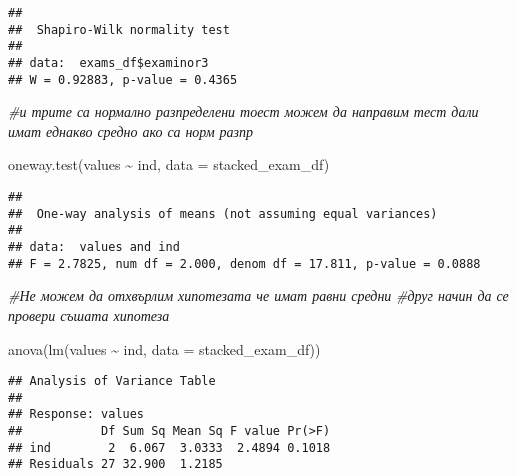 \documentclass[
]{article}
\newenvironment{Shaded}{\begin{snugshade}}{\end{snugshade}}
\newcommand{\AttributeTok}[1]{\textcolor[rgb]{0.77,0.63,0.00}{#1}}
\newcommand{\CommentTok}[1]{\textcolor[rgb]{0.56,0.35,0.01}{\textit{#1}}}
\newcommand{\FunctionTok}[1]{\textcolor[rgb]{0.00,0.00,0.00}{#1}}
\newcommand{\NormalTok}[1]{#1}
\newcommand{\OtherTok}[1]{\textcolor[rgb]{0.56,0.35,0.01}{#1}}
\newcommand{\SpecialCharTok}[1]{\textcolor[rgb]{0.00,0.00,0.00}{#1}}
\newcommand{\StringTok}[1]{\textcolor[rgb]{0.31,0.60,0.02}{#1}}
\begin{document}
\begin{verbatim}
## 
##  Shapiro-Wilk normality test
## 
## data:  exams_df$examinor3
## W = 0.92883, p-value = 0.4365
\end{verbatim}

\begin{Shaded}
\begin{Highlighting}[]
\CommentTok{\#и трите са нормално  разпределени тоест можем да направим тест дали имат еднакво средно ако са норм разпр}

\FunctionTok{oneway.test}\NormalTok{(values }\SpecialCharTok{\textasciitilde{}}\NormalTok{ ind, }\AttributeTok{data =}\NormalTok{ stacked\_exam\_df)}
\end{Highlighting}
\end{Shaded}

\begin{verbatim}
## 
##  One-way analysis of means (not assuming equal variances)
## 
## data:  values and ind
## F = 2.7825, num df = 2.000, denom df = 17.811, p-value = 0.0888
\end{verbatim}

\begin{Shaded}
\begin{Highlighting}[]
\CommentTok{\#Не можем да отхвърлим хипотезата че имат равни средни}
\CommentTok{\#друг начин да се провери съшата хипотеза}

\FunctionTok{anova}\NormalTok{(}\FunctionTok{lm}\NormalTok{(values }\SpecialCharTok{\textasciitilde{}}\NormalTok{ ind, }\AttributeTok{data =}\NormalTok{ stacked\_exam\_df))}
\end{Highlighting}
\end{Shaded}

\begin{verbatim}
## Analysis of Variance Table
## 
## Response: values
##           Df Sum Sq Mean Sq F value Pr(>F)
## ind        2  6.067  3.0333  2.4894 0.1018
## Residuals 27 32.900  1.2185
\end{verbatim}

\begin{Shaded}
\end{Shaded}
\end{document}

